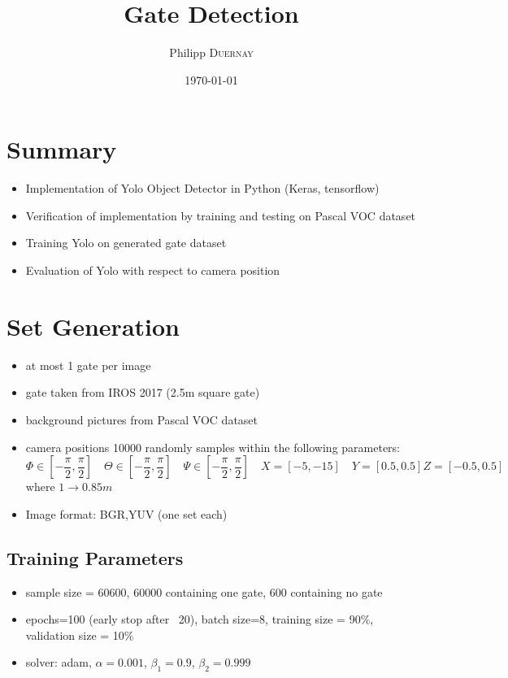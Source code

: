 \documentclass{article}
\title{Gate Detection} %
\author{Philipp \textsc{Duernay}} %
\date{\today} %
\begin{document}
\maketitle


\section{Summary}

\begin{itemize}
	\item Implementation of Yolo Object Detector \cite{Redmon1,Redmon2} in Python (Keras, tensorflow)
	\item Verification of implementation by training and testing on Pascal VOC dataset
	\item Training Yolo on generated gate dataset
	\item Evaluation of Yolo with respect to camera position
\end{itemize}


\section{Set Generation}

\begin{itemize}
	\item at most 1 gate per image
	\item gate taken from IROS 2017 (2.5m square gate)
	\item background pictures from Pascal VOC dataset
	\item camera positions 10000 randomly samples within the following parameters: $$ \Phi \in [-\frac{\pi}{2},\frac{\pi}{2}] \quad \Theta \in [-\frac{\pi}{2},\frac{\pi}{2}] \quad \Psi \in [-\frac{\pi}{2},\frac{\pi}{2}] \quad X = [-5, -15] \quad Y = [0.5,0.5]Z = [-0.5,0.5]$$ where $1 \rightarrow 0.85m$
	\item Image format: BGR,YUV (one set each)
\end{itemize}

\subsection{Training Parameters}
\begin{itemize}
	\item sample size = 60600, 60000 containing one gate, 600 containing no gate
	\item epochs=100 (early stop after ~20), batch size=8, training size = 90\%, validation size = 10\%
	\item solver: adam, $\alpha = 0.001$, $\beta_1 = 0.9$, $\beta_2 = 0.999$
\end{itemize}
\end{document}
